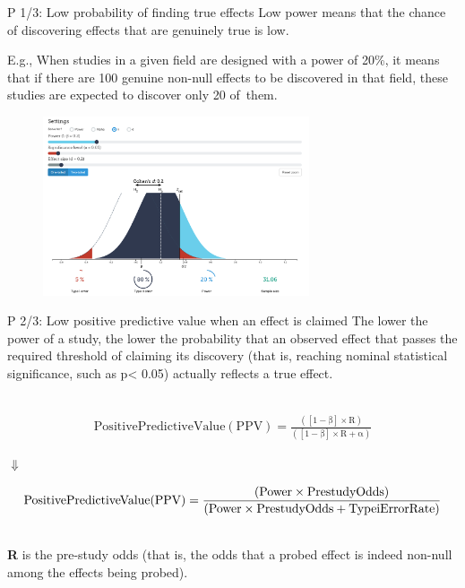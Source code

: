 \documentclass{beamer}
\begin{document}
	\begin{frame}{P 1/3: Low probability of finding true effects}
		Low power means that the chance of discovering effects that are genuinely true is low.
		
		\fontsize{10pt}{12pt}\selectfont
		E.g., When studies in a given field are designed with a power of 20\%, it means that if there are 100 genuine non-null effects to be discovered in that field, these studies are expected to discover only 20 of them.
		
		\begin{figure}[H]
			\centering
			\includegraphics[width=0.7\textwidth]{pics/low power demo.png}
		\end{figure}
	\end{frame}
	
	\begin{frame}{P 2/3: Low positive predictive value when an effect is claimed}
		The lower the power of a study, the lower the probability that an observed effect that passes the required threshold of claiming its discovery (that is, reaching nominal statistical significance, such as p< 0.05) actually reflects a true effect. 
		
		~\\ \fontsize{9pt}{11pt}\selectfont
		\begin{align*}
		\mathrm{Positive Predictive Value (PPV) = \frac{([1 - \beta] \times R)}{([1 - \beta] \times R + \alpha)}}
		\end{align*}
		\begin{center}
			$\Downarrow$
		\end{center}
		\fontsize{9pt}{11pt}\selectfont
		\[\mathrm{Positive Predictive Value (PPV) = \frac{(Power \times Prestudy Odds)}{(Power \times Prestudy Odds + Type  \uppercase\expandafter{\romannumeral1} Error Rate)}}\]
		
		~\\ \textbf{R} is the pre-study odds (that is, the odds that a probed effect is indeed non-null among the effects being probed).
	\end{frame}
	
\end{document}
